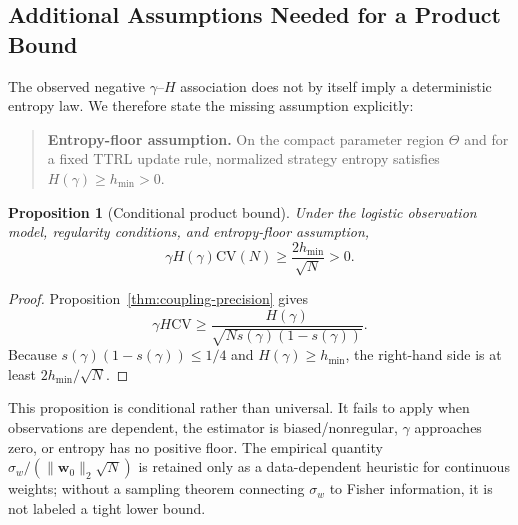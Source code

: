\documentclass[11pt]{article}
\newtheorem{proposition}{Proposition}
\begin{document}
\subsection{Additional Assumptions Needed for a Product Bound}

The observed negative $\gamma$--$H$ association does not by itself imply a deterministic entropy law. We therefore state the missing assumption explicitly:

\begin{quote}
\textbf{Entropy-floor assumption.} On the compact parameter region $\Theta$ and for a fixed TTRL update rule, normalized strategy entropy satisfies $H(\gamma)\ge h_{\min}>0$.
\end{quote}

\begin{proposition}[Conditional product bound]\label{thm:impossibility}
Under the logistic observation model, regularity conditions, and entropy-floor assumption,
\[
\gamma H(\gamma)\mathrm{CV}(N)
\geq \frac{2h_{\min}}{\sqrt N}>0.
\]
\end{proposition}

\begin{proof}
Proposition~\ref{thm:coupling-precision} gives
\[
\gamma H\mathrm{CV}\geq
\frac{H(\gamma)}{\sqrt{N s(\gamma)(1-s(\gamma))}}.
\]
Because $s(\gamma)(1-s(\gamma))\leq1/4$ and $H(\gamma)\ge h_{\min}$, the right-hand side is at least $2h_{\min}/\sqrt N$.
\end{proof}

This proposition is conditional rather than universal. It fails to apply when observations are dependent, the estimator is biased/nonregular, $\gamma$ approaches zero, or entropy has no positive floor. The empirical quantity $\sigma_w/(\|\mathbf{w}_0\|_2\sqrt N)$ is retained only as a data-dependent heuristic for continuous weights; without a sampling theorem connecting $\sigma_w$ to Fisher information, it is not labeled a tight lower bound.
\end{document}
